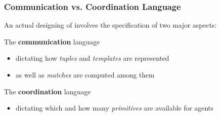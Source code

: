 \documentclass[presentation]{beamer}\mode<presentation>{\usetheme{AMSCesenaPurpleAndGold}}
\begin{document}
\begin{frame}%
	\frametitle{Communication vs. Coordination Language}

	An actual designing of \linda{} involves the specification of two major aspects:

	\vfill

	\begin{block}{The \textbf{communication} language}
		\begin{itemize}
			\item dictating how \emph{tuples} and \emph{templates} are represented
			\item as well as \emph{matches} are computed among them
		\end{itemize}
	\end{block}

	\vfill

	\begin{block}{The \textbf{coordination} language}
		\begin{itemize}
			\item dictating which and how many \emph{primitives} are available for agents
		\end{itemize}
	\end{block}

\end{frame}
\end{document}
